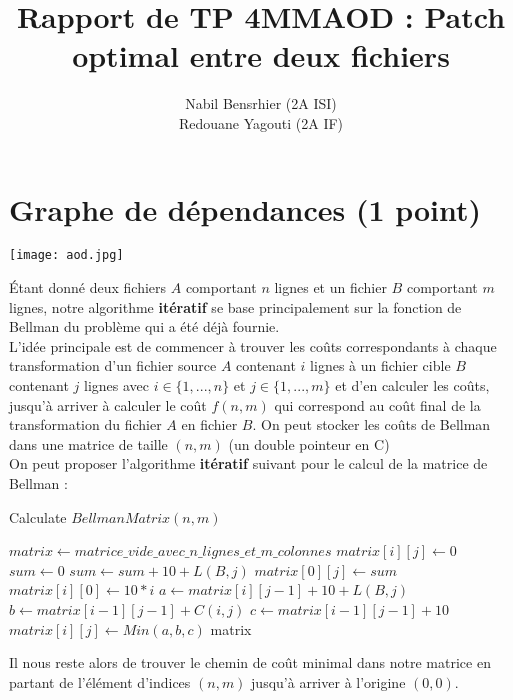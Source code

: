 \documentclass[a4paper,10pt,french]{article}
\title{Rapport de TP 4MMAOD : Patch optimal entre deux fichiers}
\author{
Nabil Bensrhier (2A ISI)
\\ Redouane Yagouti (2A IF)
}
\begin{document}
\maketitle


\section{Graphe de dépendances (1 point)}
\texttt{[image: aod.jpg]}\\

{Étant donné deux fichiers $A$ comportant $n$ lignes et un fichier $B$ comportant $m$ lignes, notre algorithme {\bf itératif} se base principalement sur la fonction de Bellman du problème qui a été déjà fournie.\\

L'idée principale est de commencer à trouver les coûts correspondants à chaque transformation d'un fichier source $A$ contenant $i$ lignes à un fichier cible $B$ contenant $j$ lignes avec $i \in \{1,...,n\}$ et $j \in \{1,...,m\}$ et d'en calculer les coûts, jusqu'à arriver à calculer le coût $f(n, m)$ qui correspond au coût final de la transformation du fichier $A$ en fichier $B$. On peut stocker les coûts de Bellman dans une matrice de taille $(n, m)$ (un double pointeur en C)\\

On peut proposer l'algorithme {\bf itératif} suivant pour le calcul de la matrice de Bellman :\\
\begin{algorithm}
\caption{Calculate $BellmanMatrix(n, m)$}
\begin{algorithmic}
\STATE $matrix \leftarrow matrice\_ vide\_ avec \_n\_ lignes\_ et\_ m \_colonnes$
\STATE $matrix[i][j] \leftarrow 0$
\STATE $sum \leftarrow 0$
\STATE $sum \leftarrow sum + 10 + L(B, j)$
\ENDFOR
\STATE $matrix[0][j] \leftarrow sum$
\STATE $matrix[i][0] \leftarrow 10 * i$
\ELSE
\STATE $a \leftarrow matrix[i][j-1]+10+L(B,j)$
\STATE $b \leftarrow matrix[i-1][j-1]+C(i,j)$
\STATE $c \leftarrow matrix[i-1][j-1]+10$
\STATE $matrix[i][j] \leftarrow Min(a, b, c)$
\ENDIF
\ENDFOR
\ENDFOR
\RETURN matrix
\end{algorithmic}
\end{algorithm}

Il nous reste alors de trouver le chemin de coût minimal dans notre matrice en partant de l'élément d'indices $(n, m)$ jusqu'à arriver à l'origine $(0, 0)$.

}
\end{document}
